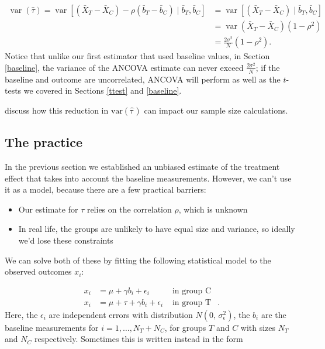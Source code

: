 \documentclass[
  openany]{book}
\providecommand{\tightlist}{%
  \setlength{\itemsep}{0pt}\setlength{\parskip}{0pt}}
\theoremstyle{definition}
\theoremstyle{definition}
\theoremstyle{definition}
\theoremstyle{definition}
\theoremstyle{remark}
\begin{document}
\[
\begin{aligned}
\operatorname{var}\left(\hat{\tau}\right) = \operatorname{var}\left[\left(\bar{X}_T - \bar{X}_C\right) - \rho\left(\bar{b}_T - \bar{b}_C\right)\mid{\bar{b}_T,\bar{b}_C}\right] &= \operatorname{var}\left[\left(\bar{X}_T - \bar{X}_C\right) \mid{\bar{b}_T,\bar{b}_C}\right]\\
& = \operatorname{var}\left(\bar{X}_T - \bar{X}_C\right)\left(1-\rho^2\right)\\
& = \frac{2\sigma^2}{N}\left(1-\rho^2\right).
\end{aligned}
\]
Notice that unlike our first estimator that used baseline values, in Section \ref{baseline}, the variance of the ANCOVA estimate can never exceed \(\frac{2\sigma^2}{N}\); if the baseline and outcome are uncorrelated, ANCOVA will perform as well as the \(t\)-tests we covered in Sections \ref{ttest} and \ref{baseline}.

\citet{borm2007simple} discuss how this reduction in \(\operatorname{var\left(\hat{\tau}\right)}\) can impact our sample size calculations.

\hypertarget{ancova-practice}{%
\subsection{The practice}\label{ancova-practice}}

In the previous section we established an unbiased estimate of the treatment effect that takes into account the baseline measurements. However, we can't use it as a model, because there are a few practical barriers:

\begin{itemize}
\tightlist
\item
  Our estimate for \(\tau\) relies on the correlation \(\rho\), which is unknown
\item
  In real life, the groups are unlikely to have equal size and variance, so ideally we'd lose these constraints
\end{itemize}

We can solve both of these by fitting the following statistical model to the observed outcomes \(x_i\):

\[
\begin{aligned}
x_i & = \mu + \gamma b_i + \epsilon_i & \text{ in group C}\\
x_i & = \mu + \tau + \gamma b_i + \epsilon_i & \text{ in group T}&.
\end{aligned}
\]
Here, the \(\epsilon_i\) are independent errors with distribution \(N\left(0,\,\sigma^2_\epsilon\right)\), the \(b_i\) are the baseline measurements for \(i=1,\ldots,N_T+N_C\), for groups \(T\) and \(C\) with sizes \(N_T\) and \(N_C\) respectively. Sometimes this is written instead in the form
\end{document}
